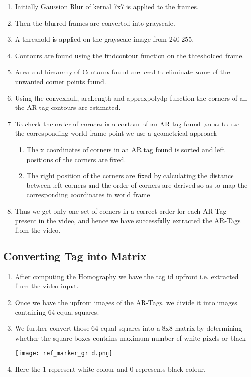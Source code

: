 \documentclass{article}
\begin{document}
\begin{enumerate}
    \item  Initially Gaussion Blur of kernal 7x7 is applied to the frames.
    \item  Then the blurred frames are converted into grayscale.
    \item  A threshold is applied on the grayscale image from 240-255.
    \item  Contours are found using the findcontour function on the thresholded frame.
    \item  Area and hierarchy of Contours found  are used to eliminate some of the unwanted corner points found.
    \item  Using the convexhull, arcLength and approxpolydp function the corners of all the AR tag contours are estimated.
    \item  To check the order of corners in a contour of an AR tag found ,so as to use the corresponding world frame point we use a geometrical approach
\begin{enumerate}
\item The x coordinates of corners in an AR tag found is sorted and left positions of the corners are fixed.
\item The right position of the corners are fixed by calculating the distance between left corners and the order of corners are derived so as to map the corresponding coordinates in world frame
\end{enumerate}
    \item  Thus we get only one set of corners in a correct order for each AR-Tag present in the video, and hence we have successfully
extracted the AR-Tags from the video.
\end{enumerate}
\subsection{Converting Tag into Matrix}
\begin{enumerate}
    \item After computing the Homography we have the tag id upfront i.e. extracted from the video input.
    \item Once we have the upfront images of the AR-Tags, we divide it into images containing 64 equal squares. 
    \item We further convert those 64 equal squares into a 8x8 matrix by determining whether the square boxes  
contains maximum number of white pixels or black
\begin{center}

    \texttt{[image: ref\_marker\_grid.png]}

    
\end{center}
    \item Here the 1 represent white colour and 0 represents black colour.
\end{enumerate}
\end{document}
